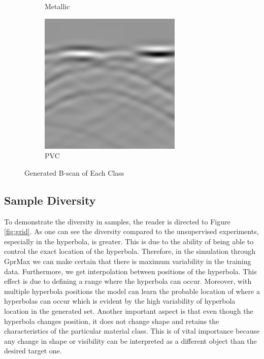 \begin{figure}[H]
\begin{subfigure}[b]{0.4\linewidth}
    \caption{Metallic}
  \end{subfigure}
  \begin{subfigure}[b]{0.4\linewidth}
    \includegraphics[width=\linewidth]{figures/sample_bscan_pvc.png}
    \caption{PVC}
  \end{subfigure}
  \caption{Generated B-scan of Each Class}
  \label{fig:image_compare}
\end{figure}

\subsection{Sample Diversity}
To demonstrate the diversity in samples, the reader is directed to Figure \ref{fig:grid}. As one can see the diversity compared to the unsupervised experiments, especially in the hyperbola, is greater. This is due to the ability of being able to control the exact location of the hyperbola. Therefore, in the simulation through GprMax we can make certain that there is maximum variability in the training data. Furthermore, we get interpolation between positions of the hyperbola. This effect is due to defining a range where the hyperbola can occur. Moreover, with multiple hyperbola positions the model can learn the probable location of where a hyperbolas can occur which is evident by the high variability of hyperbola location in the generated set. Another important aspect is that even though the hyperbola changes position, it does not change shape and retains the characteristics of the particular material class. This is of vital importance because any change in shape or visibility can be interpreted as a different object than the desired target one.

